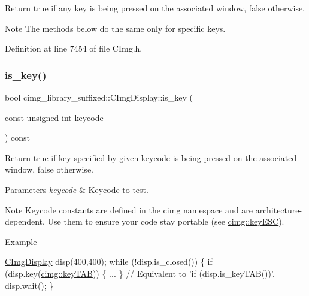 Return {\ttfamily true} if any key is being pressed on the associated window, {\ttfamily false} otherwise. 

\begin{DoxyNote}{Note}
The methods below do the same only for specific keys. 
\end{DoxyNote}


Definition at line 7454 of file C\+Img.\+h.

\mbox{\label{structcimg__library__suffixed_1_1CImgDisplay_adecafd409ac8a8d62599469dbc7379a3}} 
\subsubsection{\texorpdfstring{is\+\_\+key()}{is\_key()}\hspace{0.1cm}{\footnotesize\ttfamily [2/3]}}
{\footnotesize\ttfamily bool cimg\+\_\+library\+\_\+suffixed\+::\+C\+Img\+Display\+::is\+\_\+key (\begin{DoxyParamCaption}\item[{const unsigned int}]{keycode }\end{DoxyParamCaption}) const\hspace{0.3cm}{\ttfamily [inline]}}



Return {\ttfamily true} if key specified by given keycode is being pressed on the associated window, {\ttfamily false} otherwise. 


\begin{DoxyParams}{Parameters}
{\em keycode} & Keycode to test. \\
\hline
\end{DoxyParams}
\begin{DoxyNote}{Note}
Keycode constants are defined in the cimg namespace and are architecture-\/dependent. Use them to ensure your code stay portable (see \hyperlink{namespacecimg__library__suffixed_1_1cimg_abaabb7beac6bae90502bd8378f7037f9}{cimg\+::key\+E\+SC}). 
\end{DoxyNote}
\begin{DoxyParagraph}{Example}

\begin{DoxyCode}
\hyperlink{structcimg__library__suffixed_1_1CImgDisplay_a7716ca9a49ff94123b3417556bf4ce49}{CImgDisplay} disp(400,400);
\textcolor{keywordflow}{while} (!disp.is\_closed()) \{
  \textcolor{keywordflow}{if} (disp.key(\hyperlink{namespacecimg__library__suffixed_1_1cimg_a81af09cfde415c7b19ceab15598e0949}{cimg::keyTAB})) \{ ... \}  \textcolor{comment}{// Equivalent to 'if (disp.is\_keyTAB())'.}
  disp.wait();
\}
\end{DoxyCode}
 
\end{DoxyParagraph}


